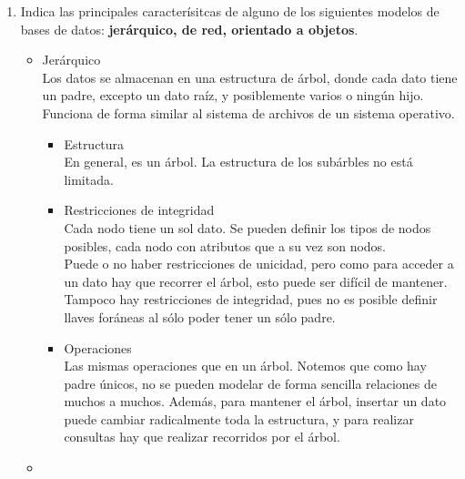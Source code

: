 \documentclass[10pt]{article}
\begin{document}
\begin{enumerate}[label=\alph*.]
        \item {
            Indica las principales caracterísitcas de alguno de los siguientes 
            modelos de bases de datos: \textbf{jerárquico, de red, orientado 
            a objetos}.
       
            \begin{itemize}
                \item {Jerárquico\\
                Los datos se almacenan en una estructura de árbol, donde cada 
                dato tiene un padre, excepto un dato raíz, y posiblemente varios
                o ningún hijo. \\
                Funciona de forma similar al sistema de archivos de un sistema 
                operativo.
                \begin{itemize}
                    \item {Estructura \\
                    En general, es un árbol. La estructura de los subárbles no 
                    está limitada.
                    }
                    \item {Restricciones de integridad \\
                    Cada nodo tiene un sol dato. Se pueden definir los tipos de 
                    nodos posibles, cada nodo con atributos que a su vez son nodos.\\
                    Puede o no haber restricciones de unicidad, pero como para 
                    acceder a un dato hay que recorrer el árbol, esto puede ser 
                    difícil de mantener. \\
                    Tampoco hay restricciones de integridad, pues no es posible 
                    definir llaves foráneas al sólo poder tener un sólo padre. 
                    }
                    \item {
                    Operaciones \\
                    Las mismas operaciones que en un árbol. Notemos que como hay
                    padre únicos, no se pueden modelar de forma sencilla relaciones
                    de muchos a muchos. Además, para mantener el árbol, insertar 
                    un dato puede cambiar radicalmente toda la estructura, y para
                    realizar consultas hay que realizar recorridos por el árbol.
                    }
                \end{itemize}
                }
                \item {
}
\end{itemize}}
\end{enumerate}
\end{document}
